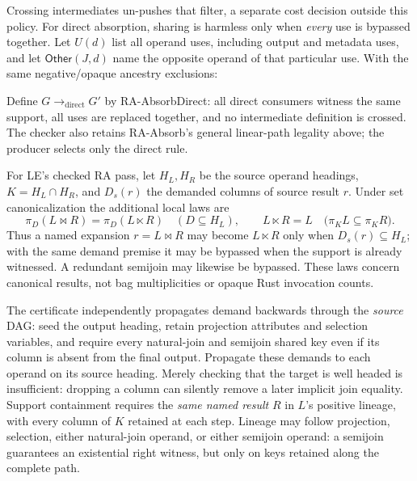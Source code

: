 Crossing intermediates un-pushes that filter, a separate cost decision outside
this policy. For direct absorption, sharing is harmless only when \emph{every}
use is bypassed together. Let $U(d)$ list all operand uses, including output
and metadata uses, and let $\mathsf{Other}(J,d)$ name the opposite operand
of that particular use. With the same negative/opaque ancestry exclusions:
\begin{mathpar}
\end{mathpar}
Define $G\longrightarrow_{\mathrm{direct}}G'$ by RA-AbsorbDirect: all direct
consumers witness the same support, all uses are replaced together, and no
intermediate definition is crossed. The checker also retains RA-Absorb's
general linear-path legality above; the producer selects only the direct rule.
\begin{mathpar}
\end{mathpar}

For LE's checked RA  pass, let $H_L,H_R$ be the
source operand headings, $K=H_L\cap H_R$, and $D_s(r)$ the demanded columns of source result
$r$. Under set canonicalization the additional local laws are
\[
 \pi_D(L\bowtie R)=\pi_D(L\ltimes R)\quad(D\subseteq H_L),
 \qquad L\ltimes R=L\quad
   \bigl(\pi_K L\subseteq\pi_K R\bigr).
\]
Thus a named expansion $r=L\bowtie R$ may become $L\ltimes R$ only when
$D_s(r)\subseteq H_L$; with the same demand premise it may be bypassed when
the support is already witnessed. A redundant semijoin may likewise be
bypassed. These laws concern canonical results, not bag multiplicities or
opaque Rust invocation counts.

The certificate independently propagates demand backwards through the
\emph{source} DAG: seed the output heading, retain projection attributes and
selection variables, and require every natural-join and semijoin shared key
even if its column is absent from the final output. Propagate these demands
to each operand on its source heading. Merely checking that the target is
well headed is insufficient: dropping a column can silently remove a later
implicit join equality. Support containment requires the \emph{same named
result} $R$ in $L$'s positive lineage, with every column of $K$ retained at
each step. Lineage may follow projection, selection, either natural-join
operand, or either semijoin operand: a semijoin guarantees an existential
right witness, but only on keys retained along the complete path.

